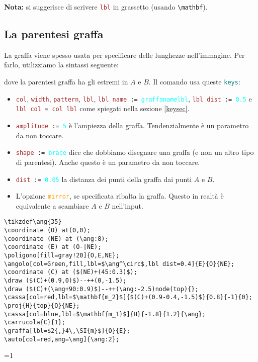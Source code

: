 \documentclass[italian, a4paper]{article}
\def\showimmagini{1} %
\def\showslowimmagini{\showimmagini} %
\newcommand{\bs}{\textbackslash}
\newcommand{\ttt}[1]{\texttt{#1}}
\newcommand{\comandons}[2][\large]{\vspace*{1mm}\noindent\fbox{\parbox{\textwidth}{#1\ttt{#2}}}}
\newcommand{\blue}[1]{\textcolor{blue}{#1}}
\newcommand{\cyan}[1]{\textcolor{cyan}{#1}}
\newcommand{\keys}{\textcolor{teal}{\ttt{keys}}}
\newcommand{\key}[1]{\textcolor{brown}{\ttt{#1}}}
\newcommand{\keyop}[1]{\textcolor{orange}{\ttt{#1}}}
\newcommand{\keyval}[1]{\cyan{\ttt{#1}}}
\begin{document}
\textbf{Nota:} si suggerisce di scrivere \key{lbl} in grassetto (usando \ttt{\bs mathbf}).

\subsection{La parentesi graffa}
La graffa viene spesso usata per specificare delle lunghezze nell'immagine. Per farlo, utilizziamo la sintassi seguente:

\comandons{\bs graffa[\keys]\{\blue{$A$}\}\{\blue{$B$}\};}
dove la parentesi graffa ha gli estremi in $A$ e $B$. Il comando usa queste \keys:
\begin{itemize}[nolistsep]
\item \key{col}, \key{width}, \key{pattern}, \key{lbl}, \ttt{\key{lbl name} := \keyval{graffanamelbl}}, \ttt{\key{lbl dist} := \keyval{0.5}} e \ttt{\key{lbl col} = \key{col lbl}} come spiegati nella sezione \ref{keysec}.
\item \ttt{\key{amplitude} := \keyval{5}} è l'ampiezza della graffa. Tendenzialmente è un parametro da non toccare.
\item \ttt{\key{shape} := \keyval{brace}} dice che dobbiamo disegnare una graffa (e non un altro tipo di parentesi). Anche questo è un parametro da non toccare.
\item \ttt{\key{dist} := \keyval{0.05}} la distanza dei punti della graffa dai punti $A$ e $B$.
\item L'opzione \keyop{mirror}, se specificata ribalta la graffa. Questo in realtà è equivalente a scambiare $A$ e $B$ nell'input.
\end{itemize}

\begin{Verbatim}[frame=single]
\tikzdef\ang{35}
\coordinate (O) at(0,0);
\coordinate (NE) at (\ang:8);
\coordinate (E) at (O-|NE);
\poligono[fill=gray!20]{O,E,NE};
\angolo[col=Green,fill,lbl=$\ang^\circ$,lbl dist=0.4]{E}{O}{NE};
\coordinate (C) at ($(NE)+(45:0.3)$);
\draw ($(C)+(0.9,0)$)--++(0,-1.5);
\draw ($(C)+(\ang+90:0.9)$)--++(\ang:-2.5)node(top){};
\cassa[col=red,lbl=$\mathbf{m_2}$]{$(C)+(0.9-0.4,-1.5)$}{0.8}{-1}{0};
\proj{H}{top}{O}{NE};
\cassa[col=blue,lbl=$\mathbf{m_1}$]{H}{-1.8}{1.2}{\ang};
\carrucola{C}{1};
\graffa[lbl=$2{,}4\,\SI{m}$]{O}{E};
\auto[col=red,ang=\ang]{\ang:2};
\end{Verbatim}
\vspace*{-4mm}

\ifnum\showslowimmagini=1
\fi
\end{document}
